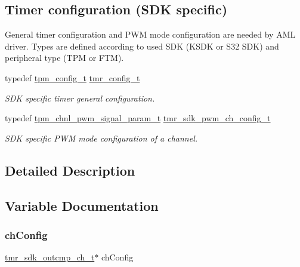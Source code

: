 \subsection*{Timer configuration (S\+DK specific)}
\label{_amgrpe376f43bc59e11ba9a2f70d1fb50a6db}%
General timer configuration and P\+WM mode configuration are needed by A\+ML driver. Types are defined according to used S\+DK (K\+S\+DK or S32 S\+DK) and peripheral type (T\+PM or F\+TM). \begin{DoxyCompactItemize}
\item 
\mbox{\label{group__struct__group_gaf1f378b0bcc8ef613858b973521fc013}} 
typedef \mbox{\hyperlink{group__tpm_ga5647039a18486c876df5cdeb84c9621d}{tpm\+\_\+config\+\_\+t}} \mbox{\hyperlink{group__struct__group_gaf1f378b0bcc8ef613858b973521fc013}{tmr\+\_\+config\+\_\+t}}
\begin{DoxyCompactList}\small\item\em S\+DK specific timer general configuration. \end{DoxyCompactList}\item 
\mbox{\label{group__struct__group_ga2b5f2d9df9d1e36f051fe92e6c6f1905}} 
typedef \mbox{\hyperlink{group__tpm_ga19383e0a3baf4033a37e96df9016ab1c}{tpm\+\_\+chnl\+\_\+pwm\+\_\+signal\+\_\+param\+\_\+t}} \mbox{\hyperlink{group__struct__group_ga2b5f2d9df9d1e36f051fe92e6c6f1905}{tmr\+\_\+sdk\+\_\+pwm\+\_\+ch\+\_\+config\+\_\+t}}
\begin{DoxyCompactList}\small\item\em S\+DK specific P\+WM mode configuration of a channel. \end{DoxyCompactList}\end{DoxyCompactItemize}


\subsection{Detailed Description}


\subsection{Variable Documentation}
\mbox{\label{group__struct__group_ga5757dff16c6d1f7f36e57e4c9cf0ddbf}} 
\subsubsection{\texorpdfstring{chConfig}{chConfig}\hspace{0.1cm}{\footnotesize\ttfamily [1/2]}}
{\footnotesize\ttfamily \mbox{\hyperlink{structtmr__sdk__outcmp__ch__t}{tmr\+\_\+sdk\+\_\+outcmp\+\_\+ch\+\_\+t}}$\ast$ ch\+Config}

